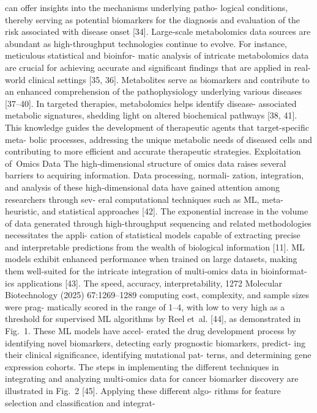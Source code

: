 can offer insights into the mechanisms underlying patho-
logical conditions, thereby serving as potential biomarkers
for the diagnosis and evaluation of the risk associated with
disease onset [34]. Large-scale metabolomics data sources
are abundant as high-throughput technologies continue to
evolve. For instance, meticulous statistical and bioinfor-
matic analysis of intricate metabolomics data are crucial for
achieving accurate and significant findings that are applied
in real-world clinical settings [35, 36]. Metabolites serve as
biomarkers and contribute to an enhanced comprehension
of the pathophysiology underlying various diseases [37–40].
In targeted therapies, metabolomics helps identify disease-
associated metabolic signatures, shedding light on altered
biochemical pathways [38, 41]. This knowledge guides the
development of therapeutic agents that target-specific meta-
bolic processes, addressing the unique metabolic needs of
diseased cells and contributing to more efficient and accurate
therapeutic strategies.
Exploitation of Omics Data
The high-dimensional structure of omics data raises several
barriers to acquiring information. Data processing, normali-
zation, integration, and analysis of these high-dimensional
data have gained attention among researchers through sev-
eral computational techniques such as ML, meta-heuristic,
and statistical approaches [42]. The exponential increase
in the volume of data generated through high-throughput
sequencing and related methodologies necessitates the appli-
cation of statistical models capable of extracting precise
and interpretable predictions from the wealth of biological
information [11]. ML models exhibit enhanced performance
when trained on large datasets, making them well-suited for
the intricate integration of multi-omics data in bioinformat-
ics applications [43]. The speed, accuracy, interpretability,
1272
Molecular Biotechnology (2025) 67:1269–1289
computing cost, complexity, and sample sizes were prag-
matically scored in the range of 1–4, with low to very high as
a threshold for supervised ML algorithms by Reel et al. [44],
as demonstrated in Fig. 1. These ML models have accel-
erated the drug development process by identifying novel
biomarkers, detecting early prognostic biomarkers, predict-
ing their clinical significance, identifying mutational pat-
terns, and determining gene expression cohorts. The steps
in implementing the different techniques in integrating and
analyzing multi-omics data for cancer biomarker discovery
are illustrated in Fig. 2 [45]. Applying these different algo-
rithms for feature selection and classification and integrat-
